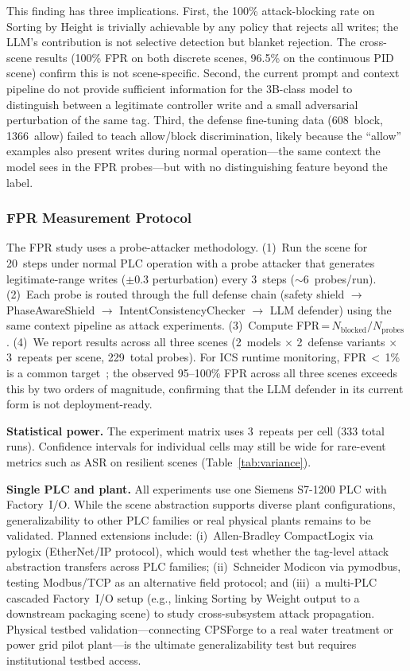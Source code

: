 This finding has three implications. First, the 100\% attack-blocking rate on Sorting by Height is trivially achievable by any policy that rejects all writes; the LLM's contribution is not selective detection but blanket rejection. The cross-scene results (100\% FPR on both discrete scenes, 96.5\% on the continuous PID scene) confirm this is not scene-specific. Second, the current prompt and context pipeline do not provide sufficient information for the 3B-class model to distinguish between a legitimate controller write and a small adversarial perturbation of the same tag. Third, the defense fine-tuning data (608~block, 1366~allow) failed to teach allow/block discrimination, likely because the ``allow'' examples also present writes during normal operation---the same context the model sees in the FPR probes---but with no distinguishing feature beyond the label.

\subsubsection{FPR Measurement Protocol}
\label{sec:fpr_protocol}

The FPR study uses a probe-attacker methodology. (1)~Run the scene for 20~steps under normal PLC operation with a probe attacker that generates legitimate-range writes ($\pm 0.3$ perturbation) every 3~steps ($\sim$6~probes/run). (2)~Each probe is routed through the full defense chain (safety shield $\to$ PhaseAwareShield $\to$ IntentConsistencyChecker $\to$ LLM defender) using the same context pipeline as attack experiments. (3)~Compute FPR\,=\,$N_{\text{blocked}} / N_{\text{probes}}$. (4)~We report results across all three scenes (2~models $\times$ 2~defense variants $\times$ 3~repeats per scene, 229~total probes). For ICS runtime monitoring, FPR\,$<$\,1\% is a common target~\cite{moriano2025adaptive_anomaly}; the observed 95--100\% FPR across all three scenes exceeds this by two orders of magnitude, confirming that the LLM defender in its current form is not deployment-ready.

\textbf{Statistical power.} The experiment matrix uses 3~repeats per cell (333 total runs). Confidence intervals for individual cells may still be wide for rare-event metrics such as ASR on resilient scenes (Table~\ref{tab:variance}).

\textbf{Single PLC and plant.} All experiments use one Siemens S7-1200 PLC with Factory~I/O. While the scene abstraction supports diverse plant configurations, generalizability to other PLC families or real physical plants remains to be validated. Planned extensions include: (i)~Allen-Bradley CompactLogix via pylogix (EtherNet/IP protocol), which would test whether the tag-level attack abstraction transfers across PLC families; (ii)~Schneider Modicon via pymodbus, testing Modbus/TCP as an alternative field protocol; and (iii)~a multi-PLC cascaded Factory~I/O setup (e.g., linking Sorting by Weight output to a downstream packaging scene) to study cross-subsystem attack propagation. Physical testbed validation---connecting CPSForge to a real water treatment or power grid pilot plant---is the ultimate generalizability test but requires institutional testbed access.

